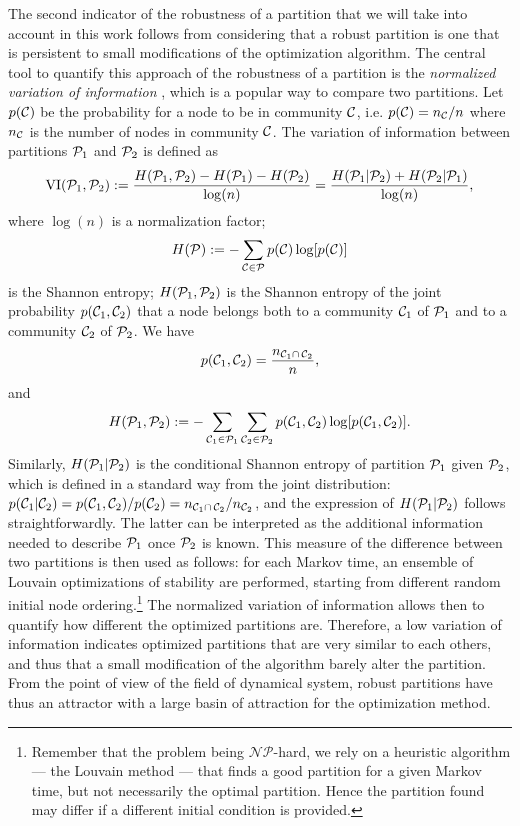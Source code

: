 \begin{sloppypar} 
The second indicator of the robustness of a partition that we will take into account in this work follows from considering that a robust partition is one that is persistent to small modifications of the optimization algorithm. The central tool to quantify this approach of the robustness of a partition is the \textit{normalized variation of information} \cite{meilua2007comparing}, which is a popular way to compare two partitions. Let $p(\C)$ be the probability for a node to be in community $\C$, i.e. $p(\C) = n_\C/n$ where $n_\C$ is the number of nodes in community $\C$. The variation of information between partitions $\P_1$ and $\P_2$ is defined as
\begin{equation} \label{eq:clustering_VI}
	\VI(\P_1,\P_2) := \frac{H(\P_1,\P_2)-H(\P_1)-H(\P_2)}{\log (n)} = \frac{H(\P_1|\P_2)+H(\P_2|\P_1)}{\log (n)},
\end{equation}
where $\log(n)$ is a normalization factor; 
\begin{equation}
	H(\P) := -\sum_{\C \in \P} p(\C) \log[p(\C)] 	
\end{equation}
is the Shannon entropy; $H(\P_1,\P_2)$ is the Shannon entropy of the joint probability $p(\C_1,\C_2)$ that a node belongs both to a community $\C_1$ of $\P_1$ and to a community $\C_2$ of $\P_2$. We have 
\begin{equation}
	p(\C_1,\C_2) = \frac{n_{\C_1 \cap\, \C_2}}{n},	
\end{equation}
and
\begin{equation}
	H(\P_1,\P_2) := -\sum_{\C_1 \in \P_1} \sum_{\C_2 \in \P_2} p(\C_1,\C_2) \log[p(\C_1,\C_2)].
\end{equation}
Similarly, $H(\P_1|\P_2)$ is the conditional Shannon entropy of partition $\P_1$ given $\P_2$, which is defined in a standard way from the joint distribution: $p(\C_1|\C_2) = p(\C_1,\C_2)/p(\C_2) = n_{\C_1\cap\, \C_2}/n_{\C_2}$, and the expression of $H(\P_1|\P_2)$ follows straightforwardly. The latter can be interpreted as the additional information needed to describe $\P_1$ once $\P_2$ is known. This measure of the difference between two partitions is then used as follows: for each Markov time, an ensemble of Louvain optimizations of stability are performed, starting from different random initial node ordering.\footnote{Remember that the problem being $\mathcal{NP}$-hard, we rely on a heuristic algorithm --- the Louvain method --- that finds a good partition for a given Markov time, but not necessarily the optimal partition. Hence the partition found may differ if a different initial condition is provided.} The normalized variation of information allows then to quantify how different the optimized partitions are. Therefore, a low variation of information indicates optimized partitions that are very similar to each others, and thus that a small modification of the algorithm barely alter the partition. From the point of view of the field of dynamical system, robust partitions have thus an attractor with a large basin of attraction for the optimization method. 
\end{sloppypar}